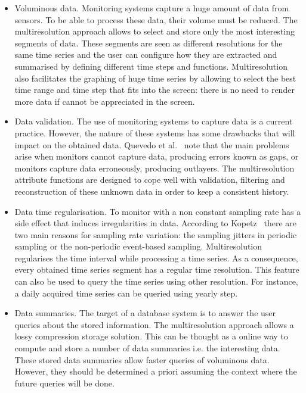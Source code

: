 \begin{itemize}
\item Voluminous data. Monitoring systems capture a huge amount of
  data from sensors. To be able to process these data, their volume must
  be reduced. The multiresolution approach allows to select and store
  only the most interesting segments of data. These segments are seen
  as different resolutions for the same time series and the user can
  configure how they are extracted and summarised by defining
  different time steps and functions. Multiresolution also facilitates
  the graphing of huge time series by allowing to select the best time
  range and time step that fits into the screen: there is no need to
  render more data if cannot be appreciated in the screen.

\item Data validation. The use of monitoring systems to capture data
  is a current practice. However, the nature of these systems has some
  drawbacks that will impact on the obtained data. Quevedo et
  al.~\cite{quevedo10} note that the main problems arise when monitors
  cannot capture data, producing errors known as gaps, or monitors
  capture data erroneously, producing outlayers.  The multiresolution
  attribute functions are designed to cope well with validation,
  filtering and reconstruction of these unknown data in order to keep
  a consistent history.

\item Data time regularisation. To monitor with a non constant
  sampling rate has a side effect that induces irregularities in data.
  According to Kopetz~\cite{kopetz11:realtime} there are two main
  reasons for sampling rate variation: the sampling jitters in
  periodic sampling or the non-periodic event-based sampling.
  Multiresolution regularises the time interval while processing a
  time series. As a consequence, every obtained time series segment
  has a regular time resolution. This feature can also be used to
  query the time series using other resolution. For instance, a daily
  acquired time series can be queried using yearly step.

\item Data summaries. The target of a database system is to answer the
  user queries about the stored information. The multiresolution
  approach allows a lossy compression storage solution. This can be
  thought as a online way to compute and store a number of data
  summaries i.e. the interesting data. These stored data summaries
  allow faster queries of voluminous data. However, they should be
  determined a priori assuming the context where the future queries
  will be done.
\end{itemize}







